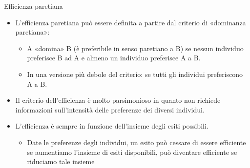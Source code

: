 \documentclass[aspectratio=64,12pt]{beamer}
\begin{document}
\begin{frame}{Efficienza paretiana}
\begin{itemize}
\item L’efficienza paretiana può essere definita a partire dal criterio di «dominanza paretiana»:
\begin{itemize}
\item A «domina» B (è preferibile in senso paretiano a B) se nessun individuo preferisce B ad A e almeno un individuo preferisce A a B.
\item In una versione più debole del criterio: se tutti gli individui preferiscono A a B.\\[1mm]
\end{itemize}
\item Il criterio dell'efficienza è molto parsimonioso in quanto non richiede informazioni sull’intensità delle preferenze dei diversi individui.
\item L'efficienza è sempre in funzione dell'insieme degli esiti possibili.
\begin{itemize}
\item Date le preferenze degli individui, un esito può cessare di essere efficiente se aumentiamo l’insieme di esiti disponibili, può diventare efficiente se riduciamo tale insieme
\end{itemize}
\end{itemize}
\end{frame}
\end{document}
